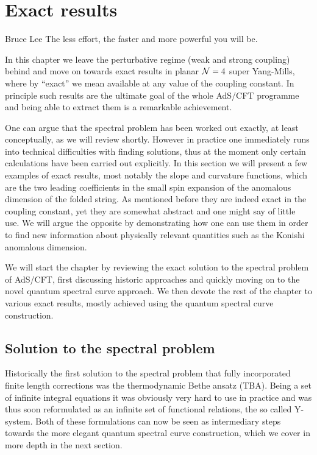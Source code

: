 
\section{Exact results}
\label{sec:exact_results}

\begin{chapquote}{Bruce Lee}
The less effort, the faster and more powerful you will be.
\end{chapquote}

\noindent In this chapter we leave the perturbative regime (weak and strong coupling) behind and move on towards exact results in planar $\mathcal{N}=4$ super Yang-Mills, where by ``exact'' we mean available at any value of the coupling constant.
In principle such results are the ultimate goal of the whole AdS/CFT programme and being able to extract them is a remarkable achievement.

One can argue that the spectral problem has been worked out exactly, at least conceptually, as we will review shortly.
However in practice one immediately runs into technical difficulties with finding solutions, thus at the moment only certain calculations have been carried out explicitly.
In this section we will present a few examples of exact results, most notably the slope and curvature functions, which are the two leading coefficients in the small spin expansion of the anomalous dimension of the folded string.
As mentioned before they are indeed exact in the coupling constant, yet they are somewhat abstract and one might say of little use.
We will argue the opposite by demonstrating how one can use them in order to find new information about physically relevant quantities such as the Konishi anomalous dimension.

We will start the chapter by reviewing the exact solution to the spectral problem of AdS/CFT, first discussing historic approaches and quickly moving on to the novel quantum spectral curve approach.
We then devote the rest of the chapter to various exact results, mostly achieved using the quantum spectral curve construction.


\subsection{Solution to the spectral problem}
\label{sec:tba_y_system}

Historically the first solution to the spectral problem that fully incorporated finite length corrections was the thermodynamic Bethe ansatz (TBA). 
Being a set of infinite integral equations it was obviously very hard to use in practice and was thus soon reformulated as an infinite set of functional relations, the so called Y-system.
Both of these formulations can now be seen as intermediary steps towards the more elegant quantum spectral curve construction, which we cover in more depth in the next section.

